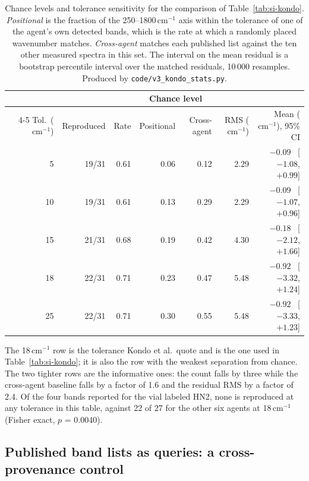 \documentclass[11pt]{article}
\newcommand*\wn{\ensuremath{\text{cm}^{-1}}}
\begin{document}
\begin{table}[htbp]
\centering
\caption{Chance levels and tolerance sensitivity for the comparison of
Table~\ref{tab:si-kondo}. \emph{Positional} is the fraction of the 250--1800\,\wn{} axis
within the tolerance of one of the agent's own detected bands, which is the rate at which a
randomly placed wavenumber matches. \emph{Cross-agent} matches each published list against
the ten other measured spectra in this set. The interval on the mean residual is a
bootstrap percentile interval over the matched residuals, 10\,000 resamples. Produced by
\texttt{code/v3\_kondo\_stats.py}.}
\label{tab:si-kondostats}
\small
\begin{tabular}{rrrrrrr}
\toprule
& & & \multicolumn{2}{c}{Chance level} & & \\
\cmidrule(lr){4-5}
Tol.\ (\wn) & Reproduced & Rate & Positional & Cross-agent & RMS (\wn) & Mean (\wn), 95\% CI \\
\midrule
 5 & 19/31 & 0.61 & 0.06 & 0.12 & 2.29 & $-0.09$ \ [$-1.08$, $+0.99$] \\
10 & 19/31 & 0.61 & 0.13 & 0.29 & 2.29 & $-0.09$ \ [$-1.07$, $+0.96$] \\
15 & 21/31 & 0.68 & 0.19 & 0.42 & 4.30 & $-0.18$ \ [$-2.12$, $+1.66$] \\
18 & 22/31 & 0.71 & 0.23 & 0.47 & 5.48 & $-0.92$ \ [$-3.32$, $+1.24$] \\
25 & 22/31 & 0.71 & 0.30 & 0.55 & 5.48 & $-0.92$ \ [$-3.33$, $+1.23$] \\
\bottomrule
\end{tabular}

\begin{flushleft}\footnotesize The 18\,\wn{} row is the tolerance Kondo et al.\ quote and is
the one used in Table~\ref{tab:si-kondo}; it is also the row with the weakest separation
from chance. The two tighter rows are the informative ones: the count falls by three while
the cross-agent baseline falls by a factor of 1.6 and the residual RMS by a factor of 2.4.
Of the four bands reported for the vial labeled HN2, none is reproduced at any tolerance
in this table, against 22 of 27 for the other six agents at 18\,\wn{} (Fisher exact,
$p$ = 0.0040).\end{flushleft}
\end{table}
\clearpage

\subsection{Published band lists as queries: a cross-provenance control}
\label{si:xprov}
\end{document}

